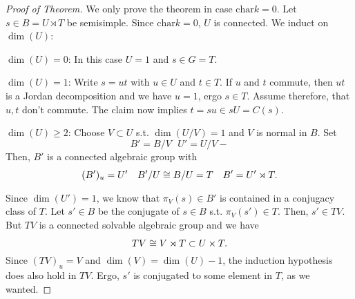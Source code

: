 \begin{proof}[Proof of Theorem]
	We only prove the theorem in case $\mathrm{char} k = 0$.
	Let $s \in B = U\rtimes T$ be semisimple. Since $\mathrm{char} k = 0$, $U$ is connected.
	We induct on $\dim(U)$:
	
	$\dim(U) = 0$: In this case $U = 1$ and $s \in G= T$.
	
	$\dim(U) = 1$: Write $s = ut$ with $u \in U$ and $t \in T$. If $u$ and $t$ commute, then $ut$ is a Jordan decomposition and we have $u = 1$, ergo $s \in T$.
	Assume therefore, that $u,t$ don't commute. The claim now implies $t = su \in sU = C(s)$.
	
	$\dim(U) \geq 2$: Choose $V \subset U$ s.t. $\dim(U / V) = 1$ and $V$ is normal in $B$. Set
	\[ B' = B/V ~~~ U' = U/V- \]
	Then, $B'$ is a connected algebraic group with
	\[ (B')_u = U'~~~
	B' / U \overset{}{\cong} B/U = T~~~
	B' = U' \rtimes T. \]

Since $\dim(U') = 1$, we know that $\pi_V(s) \in B'$ is contained in a conjugacy class of $T$.
Let $s'\in B$ be the conjugate of $s \in B$ s.t. $\pi_V(s') \in T$. Then,
$ s' \in TV$.
But $TV$ is a connected solvable algebraic group and we have
\[ TV \overset{}{\cong} V \rtimes T \subset U \times T. \]
Since $(TV)_u = V$ and $\dim(V) = \dim(U) - 1$, the induction hypothesis does also hold in $TV$. Ergo, $s'$ is conjugated to some element in $T$, as we wanted.
\end{proof}

